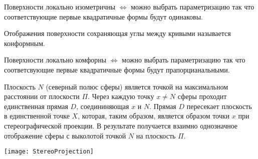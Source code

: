 \begin{theorem}
  Поверхности локально изометричны $\Leftrightarrow$ можно выбрать
  параметризацию так что соответствующие первые квадратичные формы будут
  одинаковы.
\end{theorem}

\begin{define}
  Отображения поверхности сохраняющая углы между кривыми называется
  конформным.
\end{define}

\begin{theorem}
  Поверхности локально комфорны $\Leftrightarrow$ можно выбрать
  параметризацию так что соответсвующие первые квадратичные формы будут
  прапорцианальными.
\end{theorem}

\begin{define}
  Плоскость $N$ (северный полюс сферы) является точкой на максимальном
  расстоянии от плоскости $\Pi$. Через каждую точку $x \not= N$ сферы проходит
  единственная прямая $D$, соедининяющая $x$ и $N$. Прямая $D$ пересекает
  плоскость в единственной точке $X$, которая, таким образом, является образом
  точки $x$ при стереографической проекции. В результате получается взаимно
  однозначное отображение сферы с выколотой точкой $N$ на плоскость $\Pi$.

  \texttt{[image: StereoProjection]}
\end{define}
